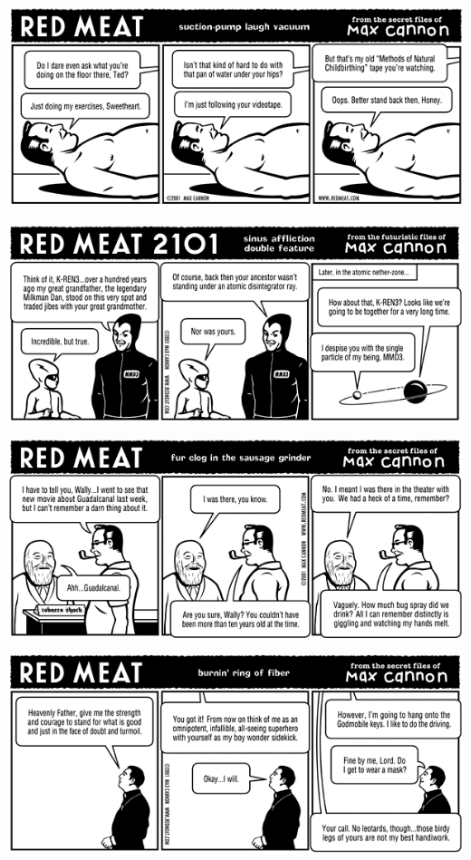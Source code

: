 \documentclass[a4paper,twoside,11pt]{article}
\begin{document}
\includegraphics[width=\textwidth]{redmeat_2001-09-04.png}



\includegraphics[width=\textwidth]{redmeat_2001-09-11.png}



\includegraphics[width=\textwidth]{redmeat_2001-09-18.png}



\includegraphics[width=\textwidth]{redmeat_2001-09-25.png}
\end{document}
